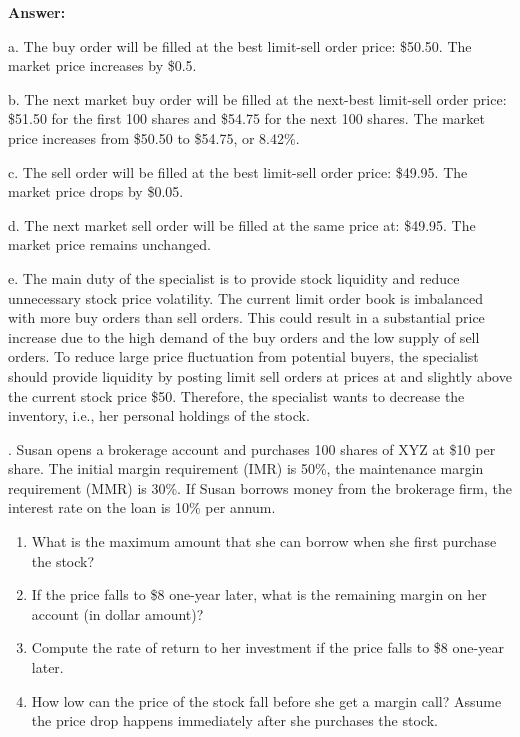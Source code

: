 \documentclass[11.5pt]{article}
\begin{document}
\vspace{10pt}

\indent \textbf{Answer:} 

a. The buy order will be filled at the best limit-sell order price: \$50.50. The market price increases by \$0.5.

b. The next market buy order will be filled at the next-best limit-sell order price: \$51.50 for the first 100 shares and \$54.75 for the next 100 shares.  The market price increases from \$50.50 to \$54.75, or 8.42\%. 

c. The sell order will be filled at the best limit-sell order price: \$49.95.  The market price drops by \$0.05.

d. The next market sell order will be filled at the same price at: \$49.95. The market price remains unchanged.

e. The main duty of the specialist is to provide stock liquidity and reduce unnecessary stock price volatility. The current limit order book is imbalanced with more buy orders than sell orders. This could result in a substantial price increase due to the high demand of the buy orders and the low supply of sell orders. To reduce large price fluctuation from potential buyers, the specialist should provide liquidity by posting limit sell orders at prices at and slightly above the current stock price \$50. Therefore, the specialist wants to decrease the inventory, i.e., her personal holdings of the stock.



\vspace{40pt}



. Susan opens a brokerage account and purchases 100 shares of XYZ at \$10 per share.  The initial margin requirement (IMR) is 50\%, the maintenance margin requirement (MMR) is 30\%.  If Susan borrows money from the brokerage firm, the interest rate on the loan is 10\% per annum.  

\begin{enumerate}[a]
\item What is the maximum amount that she can borrow when she first purchase the stock?

\item If the price falls to \$8 one-year later, what is the remaining margin on her account (in dollar amount)?

\item Compute the rate of return to her investment if the price falls to \$8 one-year later.

\item How low can the price of the stock fall before she get a margin call?  Assume the price drop happens immediately after she purchases the stock. 

\end{enumerate}
\end{document}

